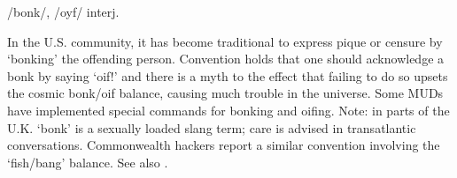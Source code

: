  /bonk/, /oyf/ interj.

In the U.S.  community, it has become traditional to express
pique or censure by `bonking' the offending person. Convention holds that one
should acknowledge a bonk by saying `oif!' and there is a myth to the effect
that failing to do so upsets the cosmic bonk/oif balance, causing much trouble
in the universe. Some MUDs have implemented special commands for bonking and
oifing. Note: in parts of the U.K. `bonk' is a sexually loaded slang term; care
is advised in transatlantic conversations. Commonwealth hackers report a similar
convention involving the `fish/bang' balance. See also .

